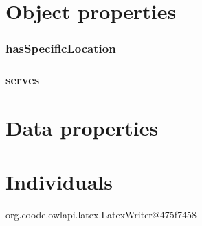 \documentclass{article}
\begin{document}
\section*{Object properties}\subsubsection*{hasSpecificLocation}

\subsubsection*{serves}

\section*{Data properties}\section*{Individuals}org.coode.owlapi.latex.LatexWriter@475f7458
\end{document}
